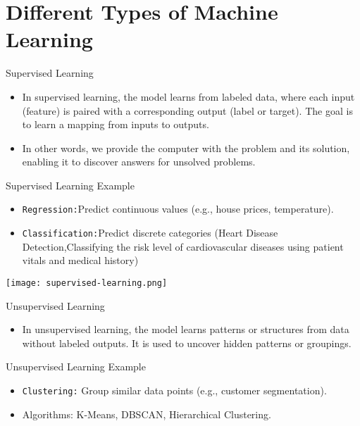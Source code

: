 \documentclass[serif, aspectratio=169]{beamer}
\begin{document}
\section{Different Types of Machine Learning}
\begin{frame}{Supervised Learning}
    \begin{itemize}
        \item In supervised learning, the model learns from labeled data, where each input (feature) is paired with a corresponding output (label or target). The goal is to learn a mapping from inputs to outputs.
        \item In other words, we provide the computer with the problem and its solution, enabling it to discover answers for unsolved problems.
    \end{itemize}
\end{frame}

\begin{frame}{Supervised Learning Example}
    \begin{itemize}
        \item \texttt{\color{orange}Regression:}Predict continuous values (e.g., house prices, temperature).
        \item \texttt{\color{orange}Classification:}Predict discrete categories (Heart Disease Detection,Classifying the risk level of cardiovascular diseases using patient vitals and medical history)
    \end{itemize}
\end{frame}

\begin{frame}
    \centering
    \texttt{[image: supervised-learning.png]}
\end{frame}

\begin{frame}{Unsupervised Learning}
    \begin{itemize}
        \item In unsupervised learning, the model learns patterns or structures from data without labeled outputs. It is used to uncover hidden patterns or groupings.
    \end{itemize}
\end{frame}

\begin{frame}{Unsupervised Learning Example}
    \begin{itemize}
        \item \texttt{\color{orange}Clustering:} Group similar data points (e.g., customer segmentation).
        \item Algorithms: K-Means, DBSCAN, Hierarchical Clustering.
    \end{itemize}
\end{frame}
\end{document}
